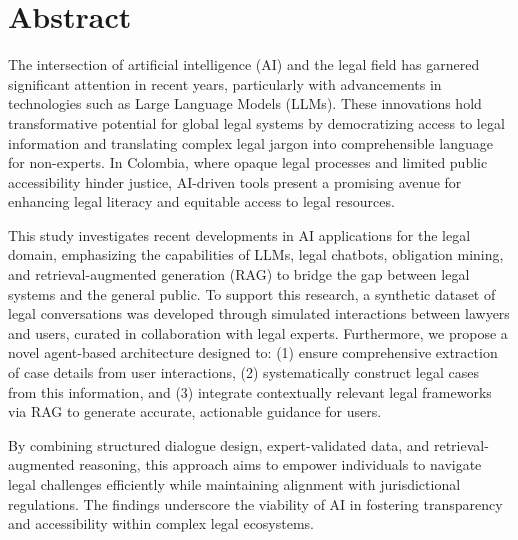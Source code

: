 
\chapter{Abstract}
The intersection of artificial intelligence (AI) and 
the legal field has garnered significant attention in 
recent years, particularly with advancements in technologies 
such as Large Language Models (LLMs). 
These innovations hold transformative potential for 
global legal systems by democratizing access to legal 
information and translating complex legal jargon into 
comprehensible language for non-experts. 
In Colombia, where opaque legal processes and 
limited public accessibility hinder justice, 
AI-driven tools present a promising avenue for enhancing 
legal literacy and equitable access to legal resources.

This study investigates recent developments in AI applications 
for the legal domain, emphasizing the capabilities of LLMs, 
legal chatbots, obligation mining, and retrieval-augmented generation (RAG) 
to bridge the gap between legal systems and the general public. 
To support this research, a synthetic dataset of legal conversations 
was developed through simulated interactions between lawyers and users, 
curated in collaboration with legal experts. 
Furthermore, we propose a novel agent-based architecture designed to: 
(1) ensure comprehensive extraction of case details from user interactions, 
(2) systematically construct legal cases from this information, 
and (3) integrate contextually relevant legal frameworks via RAG to 
generate accurate, actionable guidance for users.

By combining structured dialogue design, expert-validated data, 
and retrieval-augmented reasoning, this approach aims to empower 
individuals to navigate legal challenges efficiently while maintaining 
alignment with jurisdictional regulations. The findings underscore the 
viability of AI in fostering transparency and accessibility within complex legal ecosystems. 
\endinput


